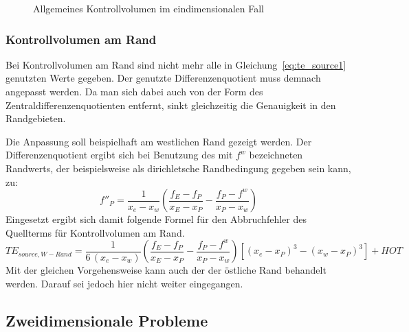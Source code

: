 \begin{figure}[bt]

\centering
\caption{Allgemeines Kontrollvolumen im eindimensionalen Fall}
\label{fig:kv1d}
\end{figure}

\subsubsection{Kontrollvolumen am Rand}

Bei Kontrollvolumen am Rand sind nicht mehr alle in Gleichung~\eqref{eq:te_source1}
genutzten Werte gegeben. Der genutzte Differenzenquotient muss demnach angepasst werden.
Da man sich dabei auch von der Form des Zentraldifferenzenquotienten entfernt,
sinkt gleichzeitig die Genauigkeit in den Randgebieten.

Die Anpassung soll beispielhaft am westlichen Rand gezeigt werden. Der Differenzenquotient
ergibt sich bei Benutzung des mit $f^w$ bezeichneten Randwerts, der beispielsweise als
dirichletsche Randbedingung gegeben sein kann, zu:
\begin{equation}
  f''_P = \frac{1}{x_e-x_w}\left(\frac{f_E-f_P}{x_E-x_P}-\frac{f_P-f^w}{x_P-x_w}\right)
\end{equation}
Eingesetzt ergibt sich damit folgende Formel für den Abbruchfehler des Quellterms
für Kontrollvolumen am Rand.
\begin{equation}
  TE_{source, W-Rand} =
\frac{1}{6\,(x_e-x_w)}\left(\frac{f_E-f_P}{x_E-x_P}-\frac{f_P-f^w}{x_P-x_w}\right)
  \left[{{(x_e-x_P)}^3-{(x_w-x_P)}^3}\right] + HOT
\end{equation}
Mit der gleichen Vorgehensweise kann auch der der östliche Rand behandelt werden. Darauf
sei jedoch hier nicht weiter eingegangen.



\subsection{Zweidimensionale Probleme}


